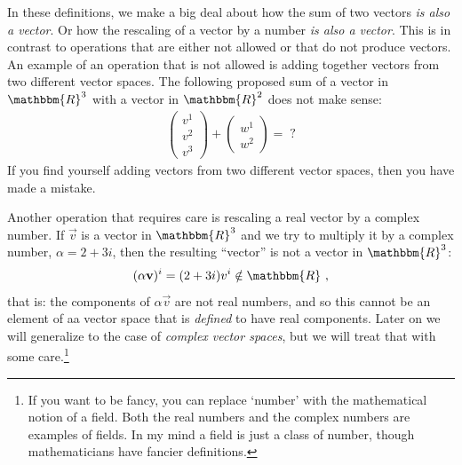 \documentclass[12pt]{article}
\begin{document}
In these definitions, we make a big deal about how the sum of two vectors \emph{is also a vector}. Or how the rescaling of a vector by a number \emph{is also a vector}. This is in contrast to operations that are either not allowed or that do not produce vectors. An example of an operation that is not allowed is adding together vectors from two different vector spaces. The following proposed sum of a vector in $\mathbbm{R}^3$ with  a vector in $\mathbbm{R}^2$ does not make sense:
\begin{align}
    \begin{pmatrix}
        v^1\\ v^2 \\v^3
    \end{pmatrix}
    +
    \begin{pmatrix}
        w^1\\ w^2 
    \end{pmatrix}
    =
    \; ?
\end{align}
If you find yourself adding vectors from two different vector spaces, then you have made a mistake.

Another operation that requires care is rescaling a real vector by a complex number. If $\vec{v}$ is a vector in $\mathbbm{R}^3$ and we try to multiply it by a complex number, $\alpha = 2+3i$, then the resulting ``vector'' is not a vector in $\mathbbm{R}^3$:
\begin{align}
    (\alpha\vec{v})^i = (2+3i)v^i \notin \mathbbm{R} \ ,
\end{align}
that is: the components of $\alpha\vec{v}$ are not real numbers, and so this cannot be an element of aa vector space that is \emph{defined} to have real components. Later on we will generalize to the case of \emph{complex vector spaces}, but we will treat that with some care.\footnote{If you want to be fancy, you can replace `number' with the mathematical notion of a field. Both the real numbers and the complex numbers are examples of fields. In my mind a field is just a class of number, though mathematicians have fancier definitions.}
\end{document}
